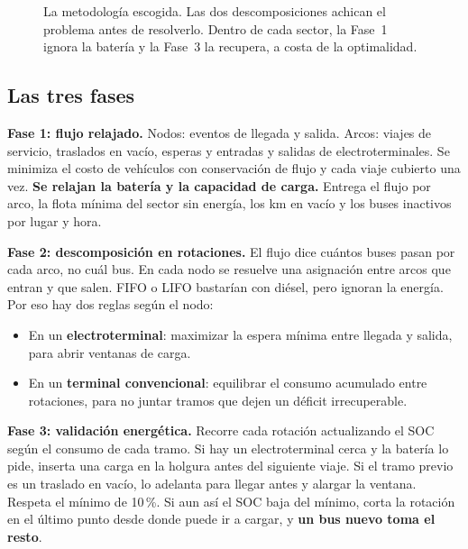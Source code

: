 \documentclass[11pt,a4paper,parskip=half]{scrartcl}
\begin{document}
\begin{figure}[htbp]
\caption{La metodología escogida. Las dos descomposiciones achican el problema antes de resolverlo. Dentro de cada sector, la Fase~1 ignora la batería y la Fase~3 la recupera, a costa de la optimalidad.}
\label{fig:metodologia}
\end{figure}

\subsection{Las tres fases}

\textbf{Fase 1: flujo relajado.} Nodos: eventos de llegada y salida. Arcos: viajes de servicio, traslados en vacío, esperas y entradas y salidas de electroterminales. Se minimiza el costo de vehículos con conservación de flujo y cada viaje cubierto una vez. \textbf{Se relajan la batería y la capacidad de carga.} Entrega el flujo por arco, la flota mínima del sector sin energía, los km en vacío y los buses inactivos por lugar y hora.

\textbf{Fase 2: descomposición en rotaciones.} El flujo dice cuántos buses pasan por cada arco, no cuál bus. En cada nodo se resuelve una asignación entre arcos que entran y que salen. FIFO o LIFO bastarían con diésel, pero ignoran la energía. Por eso hay dos reglas según el nodo:
\begin{itemize}
  \item En un \textbf{electroterminal}: maximizar la espera mínima entre llegada y salida, para abrir ventanas de carga.
  \item En un \textbf{terminal convencional}: equilibrar el consumo acumulado entre rotaciones, para no juntar tramos que dejen un déficit irrecuperable.
\end{itemize}

\textbf{Fase 3: validación energética.} Recorre cada rotación actualizando el SOC según el consumo de cada tramo. Si hay un electroterminal cerca y la batería lo pide, inserta una carga en la holgura antes del siguiente viaje. Si el tramo previo es un traslado en vacío, lo adelanta para llegar antes y alargar la ventana. Respeta el mínimo de 10\,\%. Si aun así el SOC baja del mínimo, corta la rotación en el último punto desde donde puede ir a cargar, y \textbf{un bus nuevo toma el resto}.
\end{document}
